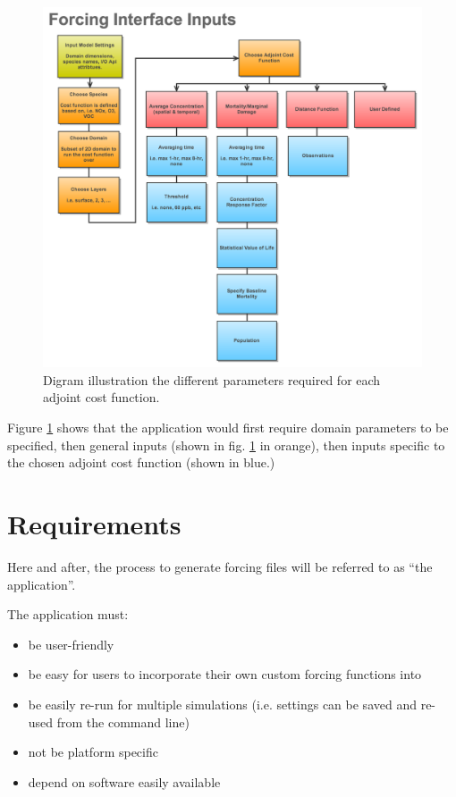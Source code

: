 \documentclass{article}
\begin{document}
\begin{figure}
	\centering
	\includegraphics[width=1.2\textwidth]{Forcing-Interface-Chart.png}
	\caption{Digram illustration the different parameters required for each adjoint cost function.}
	\label{inputs}
\end{figure}

Figure \ref{inputs} shows that the application would first require domain parameters to be specified, then general inputs (shown in fig. \ref{inputs} in orange), then inputs specific to the chosen adjoint cost function (shown in blue.)


\section{Requirements}

Here and after, the process to generate forcing files will be referred to as ``the application''.

The application must:
\begin{itemize}
	\item be user-friendly
	\item be easy for users to incorporate their own custom forcing functions into
	\item be easily re-run for multiple simulations (i.e. settings can be saved and re-used from the command line)
	\item not be platform specific
	\item depend on software easily available
\end{itemize}
\end{document}
